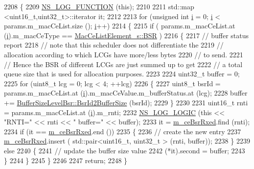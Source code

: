 \begin{DoxyCode}
2208 \{
2209   \hyperlink{log-macros-disabled_8h_a90b90d5bad1f39cb1b64923ea94c0761}{NS\_LOG\_FUNCTION} (\textcolor{keyword}{this});
2210 
2211   std::map <uint16\_t,uint32\_t>::iterator it;
2212 
2213   \textcolor{keywordflow}{for} (\textcolor{keywordtype}{unsigned} \textcolor{keywordtype}{int} \hyperlink{bernuolliDistribution_8m_a6f6ccfcf58b31cb6412107d9d5281426}{i} = 0; \hyperlink{bernuolliDistribution_8m_a6f6ccfcf58b31cb6412107d9d5281426}{i} < params.m\_macCeList.size (); \hyperlink{bernuolliDistribution_8m_a6f6ccfcf58b31cb6412107d9d5281426}{i}++)
2214     \{
2215       \textcolor{keywordflow}{if} ( params.m\_macCeList.at (\hyperlink{bernuolliDistribution_8m_a6f6ccfcf58b31cb6412107d9d5281426}{i}).m\_macCeType == \hyperlink{structns3_1_1MacCeListElement__s_a270a6526dfc7da02e9dc91823c290f6bac50796b01160b1825ec34efa1ad9f051}{MacCeListElement\_s::BSR} )
2216         \{
2217           \textcolor{comment}{// buffer status report}
2218           \textcolor{comment}{// note that this scheduler does not differentiate the}
2219           \textcolor{comment}{// allocation according to which LCGs have more/less bytes}
2220           \textcolor{comment}{// to send.}
2221           \textcolor{comment}{// Hence the BSR of different LCGs are just summed up to get}
2222           \textcolor{comment}{// a total queue size that is used for allocation purposes.}
2223 
2224           uint32\_t buffer = 0;
2225           \textcolor{keywordflow}{for} (uint8\_t lcg = 0; lcg < 4; ++lcg)
2226             \{
2227               uint8\_t bsrId = params.m\_macCeList.at (\hyperlink{bernuolliDistribution_8m_a6f6ccfcf58b31cb6412107d9d5281426}{i}).m\_macCeValue.m\_bufferStatus.at (lcg);
2228               buffer += \hyperlink{classns3_1_1BufferSizeLevelBsr_a67fc905f267ed8ac5a617fe229699122}{BufferSizeLevelBsr::BsrId2BufferSize} (bsrId);
2229             \}
2230           
2231           uint16\_t rnti = params.m\_macCeList.at (\hyperlink{bernuolliDistribution_8m_a6f6ccfcf58b31cb6412107d9d5281426}{i}).m\_rnti;
2232           \hyperlink{group__logging_ga88acd260151caf2db9c0fc84997f45ce}{NS\_LOG\_LOGIC} (\textcolor{keyword}{this} << \textcolor{stringliteral}{"RNTI="} << rnti << \textcolor{stringliteral}{" buffer="} << buffer);
2233           it = \hyperlink{classns3_1_1PssFfMacScheduler_a7adb86186e0190e6b0aa66a562499268}{m\_ceBsrRxed}.find (rnti);
2234           \textcolor{keywordflow}{if} (it == \hyperlink{classns3_1_1PssFfMacScheduler_a7adb86186e0190e6b0aa66a562499268}{m\_ceBsrRxed}.end ())
2235             \{
2236               \textcolor{comment}{// create the new entry}
2237               \hyperlink{classns3_1_1PssFfMacScheduler_a7adb86186e0190e6b0aa66a562499268}{m\_ceBsrRxed}.insert ( std::pair<uint16\_t, uint32\_t > (rnti, buffer));
2238             \}
2239           \textcolor{keywordflow}{else}
2240             \{
2241               \textcolor{comment}{// update the buffer size value}
2242               (*it).second = buffer;
2243             \}
2244         \}
2245     \}
2246 
2247   \textcolor{keywordflow}{return};
2248 \}
\end{DoxyCode}


